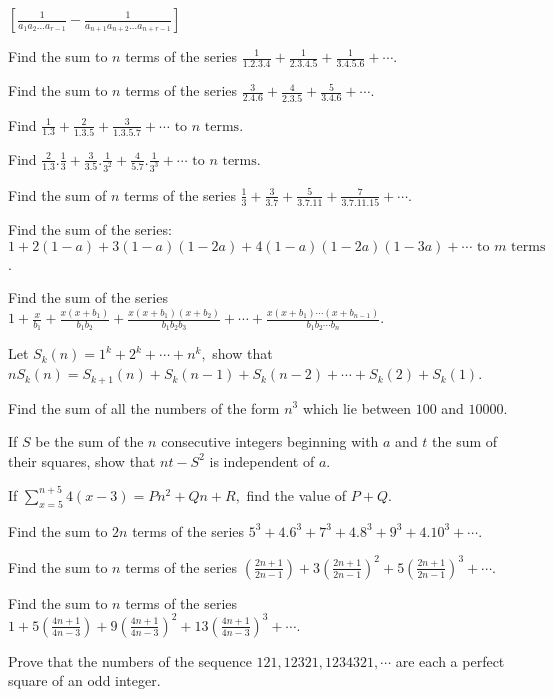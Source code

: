   $\left[\frac{1}{a_1a_2\ldots a_{r - 1}} - \frac{1}{a_{n + 1}a_{n + 2}\ldots a_{n + r - 1}}\right]$
\item Find the sum to $n$ terms of the series $\frac{1}{1.2.3.4} + \frac{1}{2.3.4.5} + \frac{1}{3.4.5.6} + \cdots$.
\item Find the sum to $n$ terms of the series $\frac{3}{2.4.6} + \frac{4}{2.3.5} + \frac{5}{3.4.6} + \cdots$.
\item Find $\frac{1}{1.3} + \frac{2}{1.3.5} + \frac{3}{1.3.5.7} + \cdots \text{~to~}n\text{~terms}$.
\item Find $\frac{2}{1.3}.\frac{1}{3} + \frac{3}{3.5}.\frac{1}{3^2} + \frac{4}{5.7}.\frac{1}{3^3} + \cdots
  \text{~to~}n\text{~terms}$.
\item Find the sum of $n$ terms of the series $\frac{1}{3} + \frac{3}{3.7} + \frac{5}{3.7.11} + \frac{7}{3.7.11.15} +
  \cdots$.
\item Find the sum of the series: $1 + 2(1 - a) + 3(1 - a)(1 - 2a) + 4(1 - a)(1 -2a)(1 - 3a) +
  \cdots\text{~to~}m\text{~terms}$.
\item Find the sum of the series $1 + \frac{x}{b_1} + \frac{x(x + b_1)}{b_1b_2} + \frac{x(x + b_1)(x + b_2)}{b_1b_2b_3} +
  \cdots + \frac{x(x + b_1)\cdots(x + b_{n - 1})}{b_1b_2\cdots b_n}$.
\item Let $S_k(n) = 1^k + 2^k + \cdots + n^k,$ show that $nS_k(n) = S_{k+1}(n) + S_k(n - 1) + S_k(n - 2) + \cdots +
  S_k(2) + S_k(1)$.
\item Find the sum of all the numbers of the form $n^3$ which lie between $100$ and $10000$.
\item If $S$ be the sum of the $n$ consecutive integers beginning with $a$ and $t$ the sum of their squares, show that
  $nt - S^2$ is independent of $a$.
\item If $\displaystyle\sum_{x = 5}^{n + 5}4(x - 3) = Pn^2 + Qn + R,$ find the value of $P + Q.$
\item Find the sum to $2n$ terms of the series $5^3 + 4.6^3 + 7^3 + 4.8^3 + 9^3 + 4.10^3 + \cdots$.
\item Find the sum to $n$ terms of the series $\left(\frac{2n + 1}{2n - 1}\right) + 3\left(\frac{2n + 1}{2n - 1}\right)^2
  + 5\left(\frac{2n + 1}{2n - 1}\right)^3 + \cdots$.
\item Find the sum to $n$ terms of the series $1 + 5\left(\frac{4n + 1}{4n - 3}\right) + 9\left(\frac{4n + 1}{4n -
  3}\right)^2 + 13\left(\frac{4n + 1}{4n - 3}\right)^3 + \cdots$.
\item Prove that the numbers of the sequence $121, 12321, 1234321, \cdots$ are each a perfect square of an odd integer.
